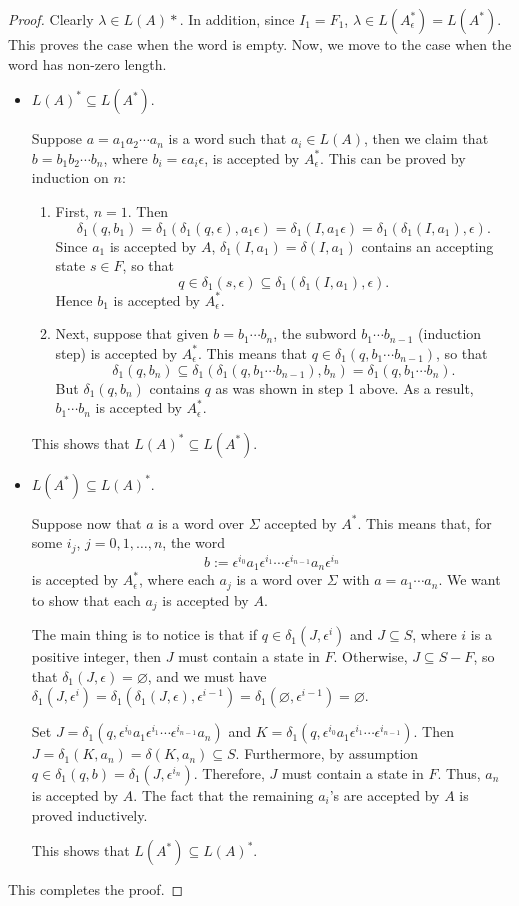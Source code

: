 \documentclass[12pt]{article}
\begin{document}
\begin{proof}  Clearly $\lambda \in L(A)*$.  In addition, since $I_1=F_1$, $\lambda \in L(A^*_{\epsilon})=L(A^*)$.  This proves the case when the word is empty.  Now, we move to the case when the word has non-zero length.

\begin{itemize}
\item $L(A)^*\subseteq L(A^*)$.

Suppose $a=a_1a_2\cdots a_n$ is a word such that $a_i\in L(A)$, then we claim that $b=b_1b_2\cdots b_n$, where $b_i=\epsilon a_i \epsilon$, is accepted by $A^*_{\epsilon}$.  This can be proved by induction on $n$: 
\begin{enumerate}
\item First, $n=1$.  Then $$\delta_1(q, b_1) = \delta_1(\delta_1(q, \epsilon), a_1\epsilon) = \delta_1(I,a_1\epsilon) = \delta_1(\delta_1(I,a_1),\epsilon).$$  Since $a_1$ is accepted by $A$, $\delta_1(I,a_1)=\delta(I,a_1)$ contains an accepting state $s\in F$, so that $$q\in \delta_1(s,\epsilon)\subseteq \delta_1( \delta_1(I,a_1), \epsilon).$$  Hence $b_1$ is accepted by $A^*_{\epsilon}$.  
\item Next, suppose that given $b=b_1\cdots b_n$, the subword $b_1 \cdots b_{n-1}$ (induction step) is accepted by $A^*_{\epsilon}$.  This means that $q\in \delta_1 (q, b_1 \cdots b_{n-1})$, so that $$\delta_1(q, b_n) \subseteq \delta_1(\delta_1(q, b_1 \cdots b_{n-1} ), b_n) = \delta_1(q, b_1 \cdots b_n).$$  But $\delta_1(q,b_n)$ contains $q$ as was shown in step 1 above.  As a result, $b_1 \cdots b_n $ is accepted by $A^*_{\epsilon}$.  
\end{enumerate}
This shows that $L(A)^*\subseteq L(A^*)$.
\item $L(A^*)\subseteq L(A)^*$.

Suppose now that $a$ is a word over $\Sigma$ accepted by $A^*$.  This means that, for some $i_j$, $j=0,1,\ldots ,n$, the word $$b:=\epsilon^{i_0} a_1 \epsilon^{i_1} \cdots \epsilon^{i_{n-1}} a_n \epsilon^{i_n}$$ is accepted by $A^*_{\epsilon}$, where each $a_j$ is a word over $\Sigma$ with $a=a_1\cdots a_n$.  We want to show that each $a_j$ is accepted by $A$.

The main thing is to notice is that if $q\in \delta_1(J,\epsilon^i)$ and $J\subseteq S$, where $i$ is a positive integer, then $J$ must contain a state in $F$.  Otherwise, $J\subseteq S-F$, so that $\delta_1(J,\epsilon)=\varnothing$, and we must have $\delta_1(J,\epsilon^i) = \delta_1(\delta_1(J,\epsilon),\epsilon^{i-1}) = \delta_1(\varnothing, \epsilon^{i-1}) =\varnothing$.

Set $J = \delta_1(q,\epsilon^{i_0} a_1 \epsilon^{i_1} \cdots \epsilon^{i_{n-1}} a_n)$ and $K=\delta_1(q,\epsilon^{i_0} a_1 \epsilon^{i_1} \cdots \epsilon^{i_{n-1}})$.  Then $J = \delta_1(K,a_n) = \delta(K,a_n) \subseteq S$.  Furthermore, by assumption $q\in \delta_1(q,b)=\delta_1(J, \epsilon^{i_n})$.  Therefore, $J$ must contain a state in $F$.  Thus, $a_n$ is accepted by $A$.  The fact that the remaining $a_i$'s are accepted by $A$ is proved inductively.

This shows that $L(A^*)\subseteq L(A)^*$.
\end{itemize}
This completes the proof.
\end{proof}
\end{document}
